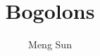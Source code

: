 \documentclass{tufte-book}
\title{Bogolons}
\author{Meng Sun}
\begin{document}
\maketitle
\tableofcontents




{}

\end{document}
